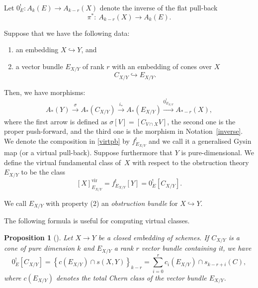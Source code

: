 \documentclass[pdftex]{sigma}
\numberwithin{equation}{section}
\newtheorem{Proposition}[Theorem]{Proposition}
 { \theoremstyle{definition}
\newtheorem{Definition}[Theorem]{Definition}
\newtheorem{Note}[Theorem]{Note}
\newtheorem{Example}[Theorem]{Example}
\newtheorem{Remark}[Theorem]{Remark}
\newtheorem{notation}[Theorem]{Notation}
\newtheorem{construction}[Theorem]{Construction}
}
\newcommand{\vv}{\mathrm{vir}}
\theoremstyle{plain}
\theoremstyle{definition}
\theoremstyle{remark}
\begin{document}
\begin{notation} \label{inverse} Let $0_E^!\colon A_k(E)\to A_{k-r}(X)$ denote the inverse of the flat pull-back
\[\pi^*\colon \ A_{k-r}(X)\to A_k(E).
\]
\end{notation}
\begin{construction}\label{naive}
Suppose that we have the following data:
\begin{enumerate}\itemsep=0pt
\item[1)] an embedding $X\hookrightarrow Y$, and
\item[2)] a vector bundle $E_{X/Y}$ of rank $r$ with an embedding of cones over $X$
 \begin{equation*}C_{X/Y}\hookrightarrow E_{X/Y}.
 \end{equation*}
\end{enumerate}
 Then, we have morphisms:
\begin{align}\label{virtpb}
A_*(Y)\xrightarrow{\sigma} A_*(C_{X/Y})\xrightarrow{i_*} A_*(E_{X/Y})\xrightarrow{0_{E_{X/Y}}^!} A_{*-r}(X),
\end{align}
where the first arrow is defined as $\sigma[V]=[C_{V\cap X} V]$, the second one is the proper push-forward, and the third one is the morphism in Notation~\ref{inverse}. We denote the composition in \eqref{virtpb} by $f^!_{E_{X/Y}}$ and we call it a generalised Gysin map (or a virtual pull-back). Suppose furthermore that $Y$ is pure-dimensional. We define the virtual fundamental class of~$X$ with respect to the obstruction theory $E_{X/Y}$ to be the class
\[[X]_{E_{X/Y}}^{\vv}=f^!_{E_{X/Y}}[Y]=0^!_E[C_{X/Y}].\]
\end{construction}
\begin{Definition}We call $E_{X/Y}$ with property (2) an \emph{obstruction bundle} for $X\hookrightarrow Y$.
\end{Definition}
The following formula is useful for computing virtual classes.
\begin{Proposition}[{\cite[Example~4.1.8]{Fulton}}]\label{prop:zerocone}
Let $X\to Y$ be a closed embedding of schemes. If $C_{X/Y}$ is a cone of pure dimension $k$ and $E_{X/Y}$ a rank $r$ vector bundle containing it, we have
\begin{equation}\label{segrechern}0^!_E[C_{X/Y}]=\left\{c(E_{X/Y})\cap s(X,Y)\right\}_{k-r}=\sum_{i=0}^r{c_i(E_{X/Y})\cap s_{k-r+i}(C)},
\end{equation}
where $c(E_{X/Y})$ denotes the total Chern class of the vector bundle $E_{X/Y}$.
\end{Proposition}
\end{document}
